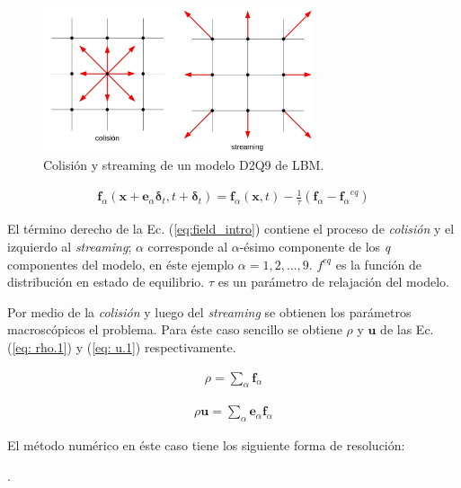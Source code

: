 \begin{figure}[h!]
	\centering
	\includegraphics[width=8cm]{grilla_stre_colli_intro.png}
	\caption{Colisión y streaming de un modelo D2Q9 de LBM.}
	\label{fig:grilla_D2Q9}
\end{figure}


\begin{align}
	\mathbf{f}_{\alpha} (\mathbf{x} + \mathbf{e}_{\alpha} \mathbf{\delta}_{t}, t + \mathbf{\delta}_{t})  = \mathbf{f}_{\alpha} (\mathbf{x}, t) - \frac{1}{\tau} (\mathbf{f}_{\alpha} - {\mathbf{f}_{\alpha}}^{eq})
	\label{eq:field_intro} 
\end{align}

El término derecho de la Ec. (\ref{eq:field_intro}) contiene el proceso de \textit{colisión} y el izquierdo al \textit{streaming}; $\alpha$ corresponde al  $\alpha$-ésimo componente de los \textit{q} componentes del modelo, en éste ejemplo $\alpha = 1, 2, ...,9$. $f^{eq}$ es la función de distribución en estado de equilibrio. $\tau$ es un parámetro de relajación del modelo. 

Por medio de la \textit{colisión} y luego del \textit{streaming} se obtienen los parámetros macroscópicos el problema. Para éste caso sencillo se obtiene $\rho$ y $\mathbf{u}$ de las Ec. (\ref{eq: rho.1}) y (\ref{eq: u.1}) respectivamente.

\begin{align}
	\rho = \sum_{\alpha} \mathbf{f}_{\alpha}
	\label{eq: rho.1}
\end{align}

\begin{align}
	\rho \mathbf{u}= \sum_{\alpha} \mathbf{e}_{\alpha} \mathbf{f}_{\alpha}
	\label{eq: u.1}
\end{align}

El método numérico en éste caso tiene los siguiente forma de resolución:
\newline
{\scriptsize

}
.
\newline 
\newline 


